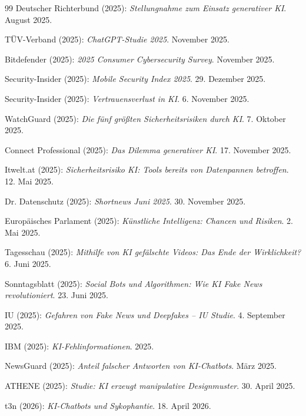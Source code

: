 \documentclass[12pt,a4paper]{article}
\begin{document}
\begin{thebibliography}{99}
		 Deutscher Richterbund (2025): \emph{Stellungnahme zum Einsatz generativer KI}. August 2025.
		
		 TÜV-Verband (2025): \emph{ChatGPT-Studie 2025}. November 2025.
		
		 Bitdefender (2025): \emph{2025 Consumer Cybersecurity Survey}. November 2025.
		
		 Security-Insider (2025): \emph{Mobile Security Index 2025}. 29. Dezember 2025.
		
		 Security-Insider (2025): \emph{Vertrauensverlust in KI}. 6. November 2025.
		
		 WatchGuard (2025): \emph{Die fünf größten Sicherheitsrisiken durch KI}. 7. Oktober 2025.
		
		 Connect Professional (2025): \emph{Das Dilemma generativer KI}. 17. November 2025.
		
		 Itwelt.at (2025): \emph{Sicherheitsrisiko KI: Tools bereits von Datenpannen betroffen}. 12. Mai 2025.
		
		 Dr. Datenschutz (2025): \emph{Shortnews Juni 2025}. 30. November 2025.
		
		 Europäisches Parlament (2025): \emph{Künstliche Intelligenz: Chancen und Risiken}. 2. Mai 2025.
		
		 Tagesschau (2025): \emph{Mithilfe von KI gefälschte Videos: Das Ende der Wirklichkeit?} 6. Juni 2025.
		
		 Sonntagsblatt (2025): \emph{Social Bots und Algorithmen: Wie KI Fake News revolutioniert}. 23. Juni 2025.
		
		 IU (2025): \emph{Gefahren von Fake News und Deepfakes – IU Studie}. 4. September 2025.
		
		 IBM (2025): \emph{KI-Fehlinformationen}. 2025.
		
		 NewsGuard (2025): \emph{Anteil falscher Antworten von KI-Chatbots}. März 2025.
		
		 ATHENE (2025): \emph{Studie: KI erzeugt manipulative Designmuster}. 30. April 2025.
		
		 t3n (2026): \emph{KI-Chatbots und Sykophantie}. 18. April 2026.
		

\end{thebibliography}
\end{document}
